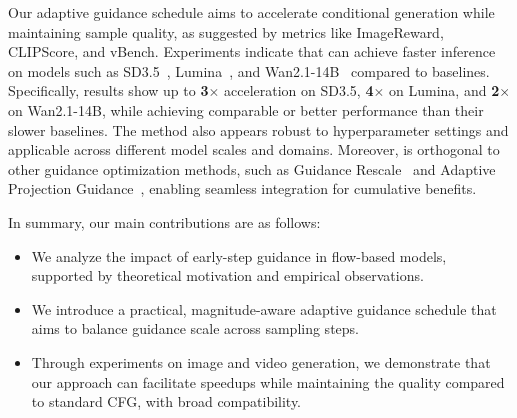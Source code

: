 Our adaptive guidance schedule aims to accelerate conditional generation while maintaining sample quality, as suggested by metrics like ImageReward, CLIPScore, and vBench. Experiments indicate that \mtdbk can achieve faster inference on models such as SD3.5~\citep{esser2024scalingrectifiedflowtransformers}, Lumina~\citep{gao2024lumina}, and Wan2.1-14B~\citep{wan2.1} compared to baselines. Specifically, results show up to \textbf{3$\times$} acceleration on SD3.5, \textbf{4$\times$} on Lumina, and \textbf{2$\times$} on Wan2.1-14B, while achieving comparable or better performance than their slower baselines. The method also appears robust to hyperparameter settings and applicable across different model scales and domains. Moreover, \mtdbk is orthogonal to other guidance optimization methods, such as Guidance Rescale~\cite{lin2024common} and Adaptive Projection Guidance~\cite{sadat2024eliminating}, enabling seamless integration for cumulative benefits.

In summary, our main contributions are as follows:
\begin{itemize}
   \item We analyze the impact of early-step guidance in flow-based models, supported by theoretical motivation and empirical observations.
   \item We introduce a practical, magnitude-aware adaptive guidance schedule that aims to balance guidance scale across sampling steps.
   \item Through experiments on image and video generation, we demonstrate that our approach can facilitate speedups while maintaining the quality compared to standard CFG, with broad compatibility.
\end{itemize}

